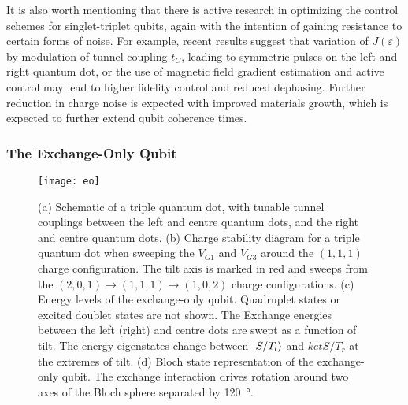 It is also worth mentioning that there is active research in optimizing the control schemes for singlet-triplet qubits, again with
the intention of gaining resistance to certain forms of noise. For example, recent results suggest that variation of $J(\varepsilon)$ by modulation of
tunnel coupling $t_C$, leading to symmetric pulses on the left and right quantum dot\cite{PhysRevB.73.205302,PhysRevB.97.155402,PhysRevLett.116.116801,PhysRevLett.118.216802},
or the use of magnetic field gradient estimation and active control\cite{ncomms6156,s41534-016-0003-1} may lead to higher
fidelity control and reduced dephasing. Further reduction in charge noise is expected with
improved materials growth, which is expected to further extend qubit coherence times\cite{PhysRevApplied.9.034008}.

\subsubsection{The Exchange-Only Qubit}

\begin{figure}
  \texttt{[image: eo]}
  \caption[Energy levels and eigenstates of an Exchange-Only qubit]
  {\label{fig:eo}(a) Schematic of a triple quantum dot, with tunable tunnel couplings between the left and centre quantum dots, and the
  right and centre quantum dots. (b) Charge stability diagram for a triple quantum dot when sweeping the $V_{G1}$ and $V_{G3}$ around the
  $(1,1,1)$ charge configuration. The tilt axis is marked in red and sweeps from the $(2,0,1) \rightarrow (1,1,1) \rightarrow (1,0,2)$
  charge configurations. (c) Energy levels of the exchange-only qubit. Quadruplet states or excited doublet states are not shown. The Exchange energies
  between the left (right) and centre dots are swept as a function of tilt. The energy eigenstates change between $\ket{S/T_l}$ and $ket{S/T_r}$
  at the extremes of tilt. (d) Bloch state representation of the exchange-only qubit. The exchange interaction drives rotation around two
  axes of the Bloch sphere separated by \SI{120}{\degree}.}
\end{figure}

